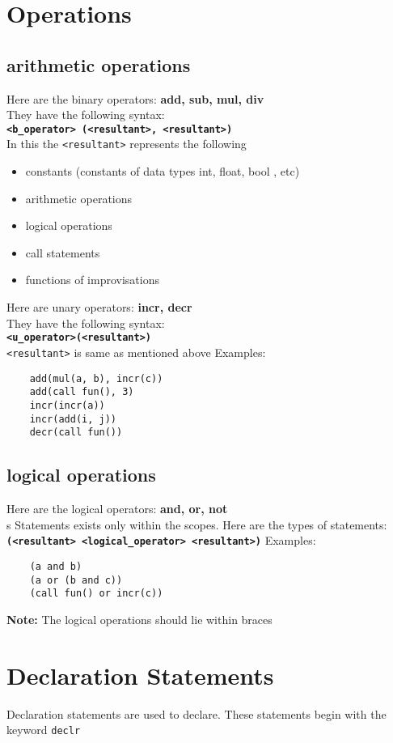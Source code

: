 \documentclass[journal, 18pt]{report}
\begin{document}
\section*{Operations}
\subsection*{arithmetic operations}
Here are the binary operators: \textbf{add, sub, mul, div}\\
They have the following syntax:\\
\textbf{\texttt{<b\_operator> (<resultant>, <resultant>)}}\\
In this the \texttt{<resultant>} represents the following
\begin{itemize}
    \item constants (constants of data types int, float, bool , etc)
    \item arithmetic operations
    \item logical operations
    \item call statements
    \item functions of improvisations
\end{itemize}
Here are unary operators: \textbf{incr, decr}\\
They have the following syntax:\\
\textbf{\texttt{<u\_operator>(<resultant>)}}\\
\texttt{<resultant>} is same as mentioned above
Examples:
\begin{lstlisting}
    add(mul(a, b), incr(c))
    add(call fun(), 3)
    incr(incr(a))
    incr(add(i, j))
    decr(call fun())
\end{lstlisting}
\subsection*{logical operations}
Here are the logical operators: \textbf{and, or, not}\\
s 
Statements exists only within the scopes. Here are the types of statements:\\
\textbf{\texttt{(<resultant> <logical\_operator> <resultant>)}}
Examples:
\begin{lstlisting}
    (a and b)
    (a or (b and c))
    (call fun() or incr(c))
\end{lstlisting}
\textbf{Note:} The logical operations should lie within braces
\section{Declaration Statements}
Declaration statements are used to declare. These statements begin with the keyword \texttt{declr}
\end{document}
